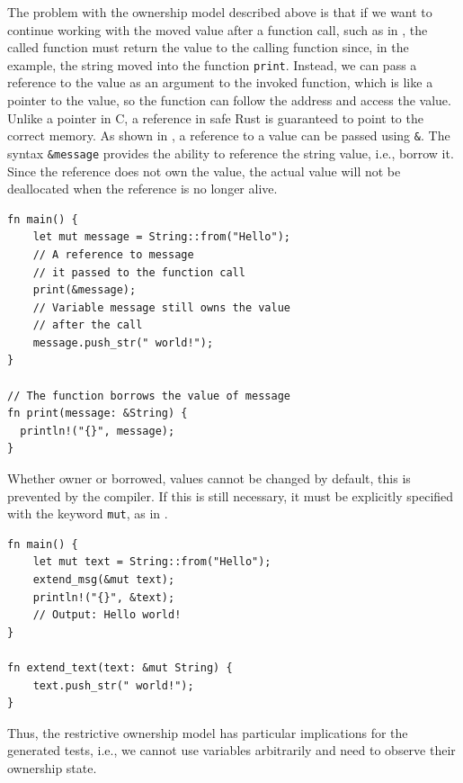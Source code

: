 \documentclass[paper=a4,%
  twoside,%
  BCOR4mm,%
  abstract=true,%
  toc=bibliography,%
  chapterprefix=true,%
  toc=bibliographynumbered,%
  open=right,%
  english,%
  pagesize=pdftex]{scrreprt}
\begin{document}
The problem with the ownership model described above is that if we want to continue working with the moved value after a function call, such as in , the called function must return the value to the calling function since, in the example, the string moved into the function \texttt{print}. Instead, we can pass a reference to the value as an argument to the invoked function, which is like a pointer to the value, so the function can follow the address and access the value. Unlike a pointer in C, a reference in safe Rust is guaranteed to point to the correct memory. As shown in , a reference to a value can be passed using \texttt{\string&}. The syntax \texttt{\string&message} provides the ability to reference the string value, i.e., borrow it. Since the reference does not own the value, the actual value will not be deallocated when the reference is no longer alive.

\begin{lstlisting}[style=boxed, caption={Transferring the ownership to a method}, label=lst:borrowing-method-call]
fn main() {
    let mut message = String::from("Hello");
    // A reference to message
    // it passed to the function call
    print(&message);
    // Variable message still owns the value
    // after the call
    message.push_str(" world!");
}

// The function borrows the value of message
fn print(message: &String) {
  println!("{}", message);
}
\end{lstlisting}

Whether owner or borrowed, values cannot be changed by default, this is prevented by the compiler. If this is still necessary, it must be explicitly specified with the keyword \texttt{mut}, as in .

\begin{lstlisting}[style=boxed, caption=Transferring the ownership to a method, label=lst:mut-borrowing-method-call]
fn main() {
    let mut text = String::from("Hello");
    extend_msg(&mut text);
    println!("{}", &text);
    // Output: Hello world!
}

fn extend_text(text: &mut String) {
    text.push_str(" world!");
}
\end{lstlisting}

Thus, the restrictive ownership model has particular implications for the generated tests, i.e., we cannot use variables arbitrarily and need to observe their ownership state.
\end{document}
